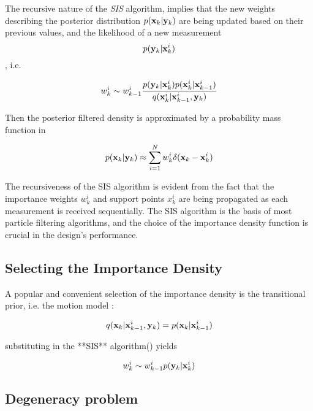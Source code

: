 The recursive nature of the \emph{SIS} algorithm, implies that the new weights describing the posterior distribution $p(\mathbf{x}_k | \mathbf{{{y}}}_k)$ are being updated based on their previous values, and the likelihood of a new measurement $$p(\mathbf{{{y}}}_k | \mathbf{x}_k^i)$$, i.e.

\begin{equation}\label{eq:SIS}
w_k^i \sim w_{k-1}^i \frac{p(\mathbf{{{y}}}_k | \mathbf{x}_k^i)p(\mathbf{x}_k^i | \mathbf{x}_{k-1}^i)}{q(\mathbf{x}_k^i | \mathbf{x}_{k-1}^i , \mathbf{{{y}}}_k)}
\end{equation}


Then the posterior filtered density is approximated by a probability mass function in 

\begin{equation}\label{eq:posterior_pmf}
p(\mathbf{x}_k | \mathbf{{{y}}}_k) \approx \sum_{i=1}^N w_k^i \delta(\mathbf{x}_k - \mathbf{x}_k^i)
\end{equation}


The recursiveness of the SIS algorithm is evident from the fact that the importance weights $w_k^i$ and support points $x_k^i$ are being propagated as each measurement is received sequentially. The SIS algorithm is the basis of most particle filtering algorithms, and the choice of the importance density function is crucial in the design's performance.

\subsection{Selecting the Importance Density}

A popular and convenient selection of the importance density is the transitional prior, i.e. the motion model \cite{Ristic2004}:

\begin{equation}\label{eq:SISmotmodel}
q(\mathbf{x}_k | \mathbf{x}_{k-1}^i , \mathbf{{{y}}}_k) = p(\mathbf{x}_k | \mathbf{x}_{k-1}^i)
\end{equation}

substituting  in the **SIS** algorithm() yields 

\begin{equation}\label{eq:SIS2}
 w_k^i \sim w_{k-1}^i p(\mathbf{{{y}}}_k | \mathbf{x}_k^i)
\end{equation}


\subsection{Degeneracy problem}


